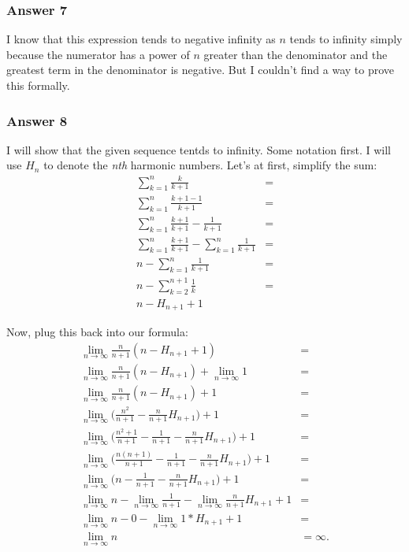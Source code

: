 \documentclass[11pt]{article}
\begin{document}
\subsubsection{Answer 7}
\label{sec-1-2-3}
I know that this expression tends to negative infinity as $n$ tends to infinity
simply because the numerator has a power of $n$ greater than the denominator and
the greatest term in the denominator is negative.  But I couldn't find a way
to prove this formally.
\subsubsection{Answer 8}
\label{sec-1-2-4}
I will show that the given sequence tentds to infinity.  Some notation first.
I will use $H_n$ to denote the \emph{nth} harmonic numbers.  Let's
at first, simplify the sum:
\begin{equation*}
  \begin{aligned}
    \sum_{k=1}^n \frac{k}{k + 1} &= \\
    \sum_{k=1}^n \frac{k + 1 - 1}{k + 1} &= \\
    \sum_{k=1}^n \frac{k + 1}{k + 1} - \frac{1}{k + 1} &= \\
    \sum_{k=1}^n \frac{k + 1}{k + 1} - \sum_{k=1}^n \frac{1}{k + 1} &= \\
    n - \sum_{k=1}^n \frac{1}{k + 1} &= \\
    n - \sum_{k=2}^{n+1} \frac{1}{k} &= \\
    n - H_{n+1} + 1
  \end{aligned}
\end{equation*}

Now, plug this back into our formula:
\begin{equation*}
  \begin{aligned}
    \lim_{n \to \infty} \frac{n}{n + 1} (n - H_{n+1} + 1) &= \\
    \lim_{n \to \infty} \frac{n}{n + 1} (n - H_{n+1}) + \lim_{n \to \infty}1 &= \\
    \lim_{n \to \infty} \frac{n}{n + 1} (n - H_{n+1}) + 1 &= \\
    \lim_{n \to \infty} \Big( \frac{n^2}{n + 1} - \frac{n}{n + 1} H_{n+1} \Big) + 1 &= \\
    \lim_{n \to \infty} \Big( \frac{n^2 + 1}{n + 1} - \frac{1}{n + 1} -
    \frac{n}{n + 1} H_{n+1} \Big) + 1 &= \\
    \lim_{n \to \infty} \Big( \frac{n(n + 1)}{n + 1} - \frac{1}{n + 1} -
    \frac{n}{n + 1} H_{n+1} \Big) + 1 &= \\
    \lim_{n \to \infty} \Big( n - \frac{1}{n + 1} - \frac{n}{n + 1} H_{n+1} \Big) + 1 &= \\
    \lim_{n \to \infty} n - \lim_{n \to \infty} \frac{1}{n + 1} -
    \lim_{n \to \infty} \frac{n}{n + 1} H_{n+1} + 1 &= \\
    \lim_{n \to \infty} n - 0 - \lim_{n \to \infty} 1 * H_{n+1} + 1 &= \\
    \lim_{n \to \infty} n &= \infty.
  \end{aligned}
\end{equation*}
\end{document}
